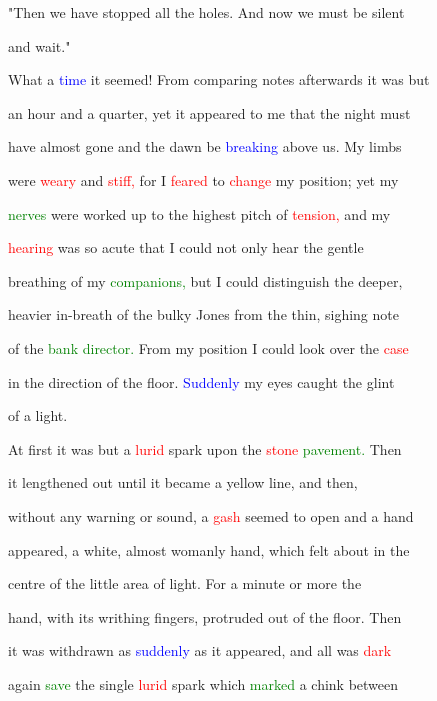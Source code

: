  "Then we have stopped all the holes. And now we must be silent

 and \textcolor{BurntOrange}{wait."}



 What a \textcolor{blue}{time} it seemed! From comparing notes afterwards it was but

 an hour and a quarter, yet it appeared to me that the night must

 have almost gone and the \textcolor{BurntOrange}{dawn} be \textcolor{blue}{breaking} above us. My limbs

 were \textcolor{red}{weary} and \textcolor{red}{stiff,} for I \textcolor{red}{feared} to \textcolor{red}{change} my position; yet my

 \textcolor{green}{nerves} were worked up to the highest pitch of \textcolor{red}{tension,} and my

 \textcolor{red}{hearing} was so acute that I could not only hear the gentle

 breathing of my \textcolor{green}{companions,} but I could distinguish the deeper,

 heavier in-breath of the bulky Jones from the thin, sighing note

 of the \textcolor{green}{bank} \textcolor{green}{director.} From my position I could look over the \textcolor{red}{case}

 in the direction of the floor. \textcolor{blue}{Suddenly} my eyes caught the glint

 of a light.



 At first it was but a \textcolor{red}{lurid} spark upon the \textcolor{red}{stone} \textcolor{green}{pavement.} Then

 it lengthened out until it became a yellow line, and then,

 without any \textcolor{BurntOrange}{warning} or sound, a \textcolor{red}{gash} seemed to open and a hand

 appeared, a \textcolor{BurntOrange}{white,} almost womanly hand, which felt about in the

 centre of the little area of light. For a minute or more the

 hand, with its writhing fingers, protruded out of the floor. Then

 it was withdrawn as \textcolor{blue}{suddenly} as it appeared, and all was \textcolor{red}{dark}

 again \textcolor{green}{save} the single \textcolor{red}{lurid} spark which \textcolor{green}{marked} a chink between

